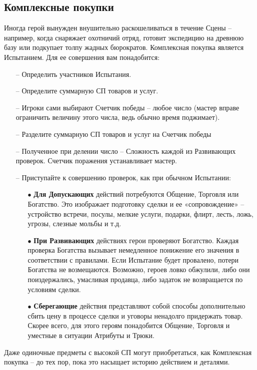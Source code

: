 \subsection{Комплексные покупки}
Иногда герой вынужден внушительно раскошеливаться в течение Сцены – например, когда снаряжает охотничий отряд, готовит экспедицию на древнюю базу или подкупает толпу жадных бюрократов. 
\newline Комплексная покупка является Испытанием. Для ее совершения вам понадобится:
\begin{itemize}
    \item[--] Определить участников Испытания.
    \item[--] Определите суммарную СП товаров и услуг.
    \item[--] Игроки сами выбирают Счетчик победы – любое число (мастер вправе ограничить величину этого числа, ведь обычно время поджимает).
    \item[--] Разделите суммарную СП товаров и услуг на Счетчик победы
    \item[--] Полученное при делении число – Сложность каждой из Развивающих проверок. Счетчик поражения устанавливает мастер.
    \item[--] Приступайте к совершению проверок, как при обычном Испытании:
        \begin{itemize}
            \item[$\bullet$] \textbf{Для Допускающих} действий потребуются Общение, Торговля или Богатство. Это изображает подготовку сделки и ее «сопровождение» – устройство встречи, посулы, мелкие услуги, подарки, флирт, лесть, ложь, угрозы, слезные мольбы и т.д.
            \item[$\bullet$] \textbf{При Развивающих} действиях герои проверяют Богатство. Каждая проверка Богатства вызывает немедленное понижение его значения в соответствии с правилами. Если Испытание будет провалено, потери Богатства не возмещаются. Возможно, героев ловко обжулили, либо они поиздержались, умасливая продавца, либо задаток не возвращается по условиям сделки.
            \item[$\bullet$] \textbf{Сберегающие} действия представляют собой способы дополнительно сбить цену в процессе сделки и уговоры ненадолго придержать товар. Скорее всего, для этого героям понадобится Общение, Торговля и уместные в ситуации Атрибуты и Трюки.
        \end{itemize}
\end{itemize}

\begin{tcolorbox}
    Даже одиночные предметы с высокой СП могут приобретаться, как Комплексная покупка – до тех пор, пока это насыщает историю действием и деталями.
\end{tcolorbox}

